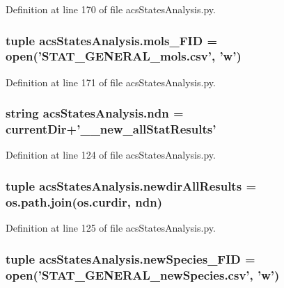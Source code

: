 Definition at line 170 of file acs\-States\-Analysis.\-py.

\hypertarget{a00130_a603a41889d8732146d44da83ffaf0489}{
\subsubsection[{mols\-\_\-\-F\-I\-D}]{\setlength{\rightskip}{0pt plus 5cm}tuple acs\-States\-Analysis.\-mols\-\_\-\-F\-I\-D = open('S\-T\-A\-T\-\_\-\-G\-E\-N\-E\-R\-A\-L\-\_\-mols.\-csv', 'w')}}\label{a00130_a603a41889d8732146d44da83ffaf0489}


Definition at line 171 of file acs\-States\-Analysis.\-py.

\hypertarget{a00130_a5e117df6e0cdffdae13947622c6c4890}{
\subsubsection[{ndn}]{\setlength{\rightskip}{0pt plus 5cm}string acs\-States\-Analysis.\-ndn = {\bf current\-Dir}+'\-\_\-\_\-new\-\_\-all\-Stat\-Results'}}\label{a00130_a5e117df6e0cdffdae13947622c6c4890}


Definition at line 124 of file acs\-States\-Analysis.\-py.

\hypertarget{a00130_a62d6cfd52b4428ab7ea4d75d43b2d49b}{
\subsubsection[{newdir\-All\-Results}]{\setlength{\rightskip}{0pt plus 5cm}tuple acs\-States\-Analysis.\-newdir\-All\-Results = os.\-path.\-join(os.\-curdir, {\bf ndn})}}\label{a00130_a62d6cfd52b4428ab7ea4d75d43b2d49b}


Definition at line 125 of file acs\-States\-Analysis.\-py.

\hypertarget{a00130_abdb6e583333cc08cac8c63631db80b5b}{
\subsubsection[{new\-Species\-\_\-\-F\-I\-D}]{\setlength{\rightskip}{0pt plus 5cm}tuple acs\-States\-Analysis.\-new\-Species\-\_\-\-F\-I\-D = open('S\-T\-A\-T\-\_\-\-G\-E\-N\-E\-R\-A\-L\-\_\-new\-Species.\-csv', 'w')}}\label{a00130_abdb6e583333cc08cac8c63631db80b5b}


